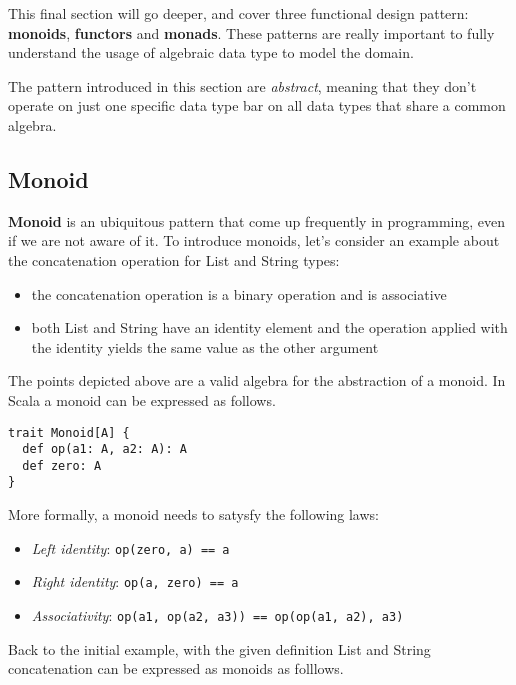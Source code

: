 This final section will go deeper, and cover three functional design
pattern: \textbf{monoids}, \textbf{functors} and \textbf{monads}. These
patterns are really important to fully understand the usage of algebraic
data type to model the domain.

The pattern introduced in this section are \emph{abstract}, meaning that
they don't operate on just one specific data type bar on all data types
that share a common algebra.

\subsection{Monoid}\label{monoid}

\textbf{Monoid} is an ubiquitous pattern that come up frequently in
programming, even if we are not aware of it. To introduce monoids, let's
consider an example about the concatenation operation for List and
String types:

\begin{itemize}
\itemsep1pt\parskip0pt
\item
  the concatenation operation is a binary operation and is associative
\item
  both List and String have an identity element and the operation
  applied with the identity yields the same value as the other argument
\end{itemize}

The points depicted above are a valid algebra for the abstraction of a
monoid. In Scala a monoid can be expressed as follows.

\begin{verbatim}
trait Monoid[A] {
  def op(a1: A, a2: A): A
  def zero: A
}
\end{verbatim}

More formally, a monoid needs to satysfy the following laws:

\begin{itemize}
\itemsep1pt\parskip0pt
\item
  \emph{Left identity}: \texttt{op(zero,\ a)\ ==\ a}
\item
  \emph{Right identity}: \texttt{op(a,\ zero)\ ==\ a}
\item
  \emph{Associativity}:
  \texttt{op(a1,\ op(a2,\ a3))\ ==\ op(op(a1,\ a2),\ a3)}
\end{itemize}

Back to the initial example, with the given definition List and String
concatenation can be expressed as monoids as folllows.

